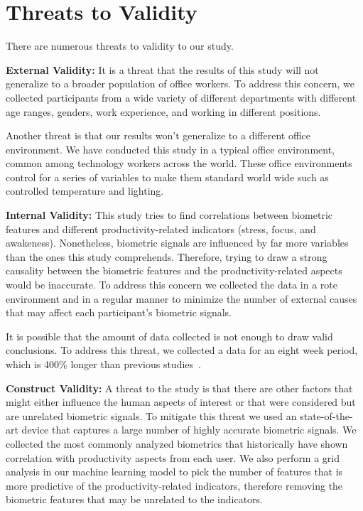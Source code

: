 \section{Threats to Validity}
There are numerous threats to validity to our study.

\textbf{External Validity:}
It is a threat that the results of this study
will not generalize to a broader population of office workers.
To address this concern, we collected participants
from a wide variety of different departments
with different age ranges, genders, work experience, and 
working in different positions.

Another threat is that our results won't generalize
to a different office environment. We have conducted
this study in a typical office environment, common
among technology workers across the world.
These office environments control for a series of
variables to make them standard world wide such
as controlled temperature and lighting.

\textbf{Internal Validity:}
This study tries to find correlations between
biometric features and different productivity-related indicators (stress, focus, and awakeness).
Nonetheless, biometric signals are influenced by far more
variables than the ones this study comprehends.
Therefore, trying to draw a strong causality between the biometric
features and the productivity-related aspects would be inaccurate.
To address this concern we collected the data
in a rote environment and in a regular manner 
to minimize the number of 
external causes that may affect each participant's
biometric signals.

It is possible that the amount of data collected
is not enough
to draw valid conclusions. To address this threat, 
we collected a data for an eight week period, which is
400\% longer than previous studies~\cite{zuger18,Muller16}.


\textbf{Construct Validity:}
A threat to the study is that
there are other factors that might either influence the
human aspects of interest or that were considered but
are unrelated biometric signals.
To mitigate this threat we used an state-of-the-art
device that captures a large number of highly accurate biometric
signals. We collected the most commonly analyzed
biometrics that historically have shown correlation with 
productivity aspects from each user.
We also perform a grid analysis in our machine learning model
to pick the number of features that is more predictive
of the productivity-related indicators, 
therefore removing the biometric
features that may be unrelated to the indicators.












